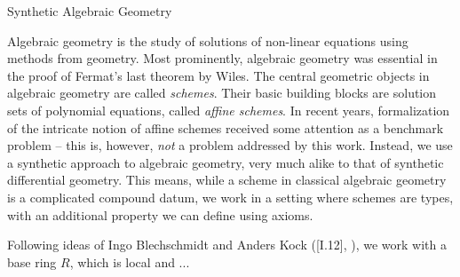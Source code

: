 \documentclass{../util/zariski}
\begin{document}
\begin{center}
  \LARGE{Synthetic Algebraic Geometry}
\end{center}

Algebraic geometry is the study of solutions of non-linear equations using methods from geometry.
Most prominently, algebraic geometry was essential in the proof of Fermat's last theorem by Wiles.
The central geometric objects in algebraic geometry are called \emph{schemes}.
Their basic building blocks are solution sets of polynomial equations, called \emph{affine schemes}.
In recent years,
formalization of the intricate notion of affine schemes
received some attention as a benchmark problem
-- this is, however, \emph{not} a problem addressed by this work.
Instead, we use a synthetic approach to algebraic geometry,
very much alike to that of synthetic differential geometry.
This means, while a scheme in classical algebraic geometry is a complicated compound datum,
we work in a setting where schemes are types,
with an additional property we can define using axioms.

Following ideas of Ingo Blechschmidt and Anders Kock  (\cite{kock-sdg}[I.12], \cite{ingo-thesis}),
we work with a base ring $R$, which is local and ...

\printbibliography
\end{document}
